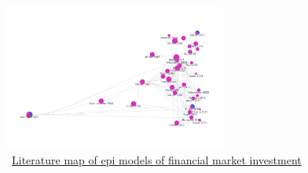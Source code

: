 \begin{figure}[!ht] \centering  %
	\caption{ ~\href{https://app.litmaps.co/shared/E25276CA-8725-437B-8241-11961EFB3FB4?wsid=1C4BD4E0-1E3C-4DBA-BAFD-5C50824CFC24}{Literature map of epi models of financial market investment}}
	\label{fig:graph_investment}
	\centerline{\includegraphics[width=0.65\textwidth]{./figures/graph_investment}}
\end{figure}
